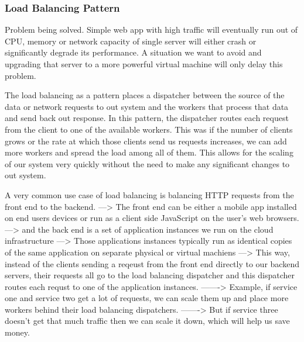 \documentclass[a4paper, 11pt]{book}
\begin{document}
    \subsubsection{Load Balancing Pattern}
    Problem being solved.
    Simple web app with high traffic will eventually run out of CPU, memory or network capacity of single server will either crash or significantly degrade its performance.
    A situation we want to avoid and upgrading that server to a more powerful virtual machine will only delay this problem.

    The load balancing as a pattern places a dispatcher between the source of the data or network requests to out system and the workers that process that data and send back out response.
    In this pattern, the dispatcher routes each request from the client to one of the available workers.
    This was if the number of clients grows or the rate at which those clients send us requests increases, we can add more workers and spread the load among all of them.
    This allows for the scaling of our system very quickly without the need to make any significant changes to out system.

    A very common use case of load balancing is balancing HTTP requests from the front end to the backend.
    ---> The front end can be either a mobile app installed on end users devices or run as a client side JavaScript on the user's web browsers.
    ---> and the back end is a set of application instances we run on the cloud infrastructure
    ---> Those applications instances typically run as identical copies of the same application on separate physical or virtual machiens
    ---> This way, instead of the clients sending a reqeust from the front end directly to our backend servers, their requests all go to the load balancing dispatcher and this dispatcher routes each requst to one of the application instances.
    -------> Example, if service one and service two get a lot of requests, we can scale them up and place more workers behind their load balancing dispatchers.
    -------> But if service three doesn't get that much traffic then we can scale it down, which will help us save money.
\end{document}
